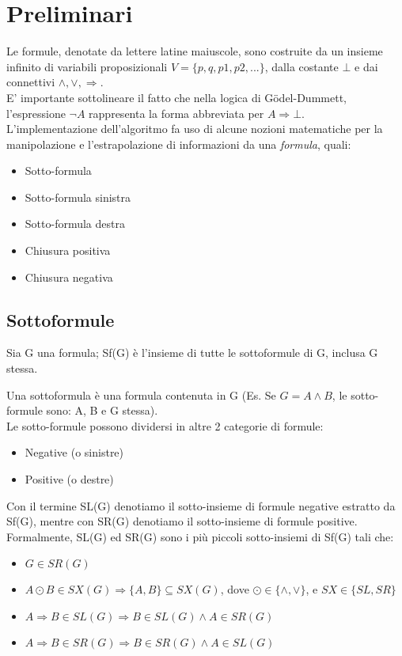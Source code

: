 \documentclass[\main/tesi.tex]{subfiles}
\begin{document}
\chapter{Preliminari}

Le formule, denotate da lettere latine maiuscole, sono costruite da un insieme infinito di variabili proposizionali \(V = \{p,q,p1,p2,...\}\), dalla costante \(\bot\) e dai connettivi \(\land, \lor, \Rightarrow\). \\
E' importante sottolineare il fatto che nella logica di G\"odel-Dummett, l'espressione \(\neg A\) rappresenta la forma abbreviata per \(A \Rightarrow \bot\). \\

L'implementazione dell'algoritmo fa uso di alcune nozioni matematiche per la manipolazione e l'estrapolazione di informazioni da una \textit{formula}, quali: \\
\begin{itemize}
    \item Sotto-formula
    \item Sotto-formula sinistra
    \item Sotto-formula destra
    \item Chiusura positiva
    \item Chiusura negativa
\end{itemize}

\section{Sottoformule}

Sia G una formula; Sf(G) è l'insieme di tutte le sottoformule di G, inclusa G stessa.

Una sottoformula è una formula contenuta in G (Es. Se \(G = A \land B\), le sotto-formule sono: A, B e G stessa). \\
Le sotto-formule possono dividersi in altre 2 categorie di formule:
\begin{itemize}
    \item Negative (o sinistre)
    \item Positive (o destre)
\end{itemize}

Con il termine SL(G) denotiamo il sotto-insieme di formule negative estratto da Sf(G), mentre con SR(G) denotiamo il sotto-insieme di formule positive. \\
Formalmente, SL(G) ed SR(G) sono i più piccoli sotto-insiemi di Sf(G) tali che:
\begin{itemize}
    \item \(G \in SR(G)\)
    \item \(A \odot B \in SX(G) \Rightarrow \{A, B\} \subseteq SX(G)\), dove \(\odot \in \{\land, \lor\}\), e \(SX \in \{SL, SR\}\)
    \item \(A \Rightarrow B \in SL(G) \Rightarrow B \in SL(G) \land A \in SR(G)\)
    \item \(A \Rightarrow B \in SR(G) \Rightarrow B \in SR(G) \land A \in SL(G)\)
\end{itemize}
\end{document}
